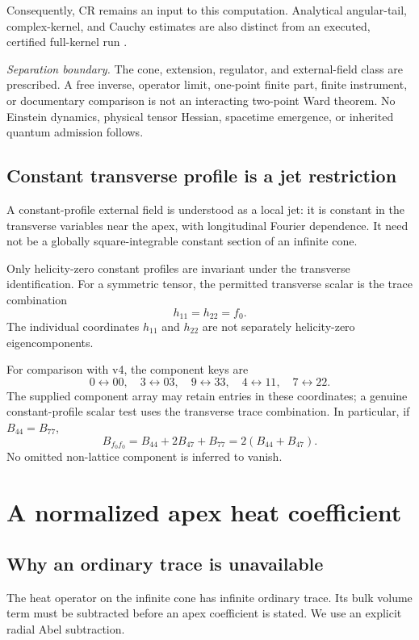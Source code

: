 \documentclass[11pt,a4paper]{article}
\newcommand{\loc}[1]{\nolinkurl{#1}}
\theoremstyle{plain}
\theoremstyle{definition}
\theoremstyle{remark}
\numberwithin{equation}{section}
\newcommand{\separation}{%
\par\smallskip\noindent
\emph{Separation boundary.}
The cone, extension, regulator, and external-field class are prescribed.
A free inverse, operator limit, one-point finite part, finite instrument,
or documentary comparison is not an interacting two-point Ward theorem.
No Einstein dynamics, physical tensor Hessian, spacetime emergence,
or inherited quantum admission follows.
}
\begin{document}
Consequently, CR remains an input to this computation.
Analytical angular-tail, complex-kernel, and Cauchy estimates
are also distinct from an executed, certified full-kernel run
\cite[{\loc{lem:modetail}, \loc{lem:complexbound},
\loc{thm:Cauchy}}]{CheungTensor}.
\separation

\subsection{Constant transverse profile is a jet restriction}

A constant-profile external field is understood as a local jet:
it is constant in the transverse variables near the apex, with
longitudinal Fourier dependence. It need not be a globally
square-integrable constant section of an infinite cone.

Only helicity-zero constant profiles are invariant under the
transverse identification. For a symmetric tensor, the permitted
transverse scalar is the trace combination
\[
h_{11}=h_{22}=f_0.
\]
The individual coordinates \(h_{11}\) and \(h_{22}\) are not
separately helicity-zero eigencomponents.

For comparison with v4, the component keys are
\[
0\leftrightarrow00,\quad
3\leftrightarrow03,\quad
9\leftrightarrow33,\quad
4\leftrightarrow11,\quad
7\leftrightarrow22.
\]
The supplied component array may retain entries in these coordinates;
a genuine constant-profile scalar test uses the transverse trace
combination. In particular, if \(B_{44}=B_{77}\),
\begin{equation}
B_{f_0f_0}=B_{44}+2B_{47}+B_{77}
          =2(B_{44}+B_{47}).
\label{eq:tracecombination}
\end{equation}
No omitted non-lattice component is inferred to vanish.

\section{A normalized apex heat coefficient}
\label{sec:heat}

\subsection{Why an ordinary trace is unavailable}

The heat operator on the infinite cone has infinite ordinary trace.
Its bulk volume term must be subtracted before an apex coefficient
is stated. We use an explicit radial Abel subtraction.
\end{document}
